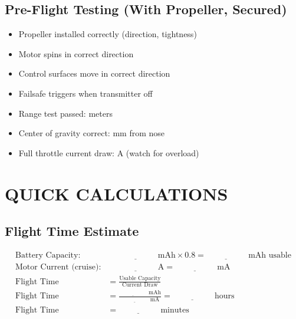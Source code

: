 \documentclass[10pt,letterpaper]{article}
\begin{document}
\subsection*{Pre-Flight Testing (With Propeller, Secured)}
\begin{itemize}[label=$\square$,nosep]
\item Propeller installed correctly (direction, tightness)
\item Motor spins in correct direction
\item Control surfaces move in correct direction
\item Failsafe triggers when transmitter off
\item Range test passed: \underline{\hspace{2cm}} meters
\item Center of gravity correct: \underline{\hspace{2cm}} mm from nose
\item Full throttle current draw: \underline{\hspace{2cm}} A (watch for overload)
\end{itemize}

\section*{QUICK CALCULATIONS}

\subsection*{Flight Time Estimate}
\begin{align*}
\text{Battery Capacity:} & \quad \underline{\hspace{2cm}} \text{ mAh} \times 0.8 = \underline{\hspace{2cm}} \text{ mAh usable} \\
\text{Motor Current (cruise):} & \quad \underline{\hspace{2cm}} \text{ A} = \underline{\hspace{2cm}} \text{ mA} \\
\text{Flight Time} & = \frac{\text{Usable Capacity}}{\text{Current Draw}} \\
\text{Flight Time} & = \frac{\underline{\hspace{2cm}} \text{ mAh}}{\underline{\hspace{2cm}} \text{ mA}} = \underline{\hspace{2cm}} \text{ hours} \\
\text{Flight Time} & = \underline{\hspace{2cm}} \text{ minutes}
\end{align*}
\end{document}
